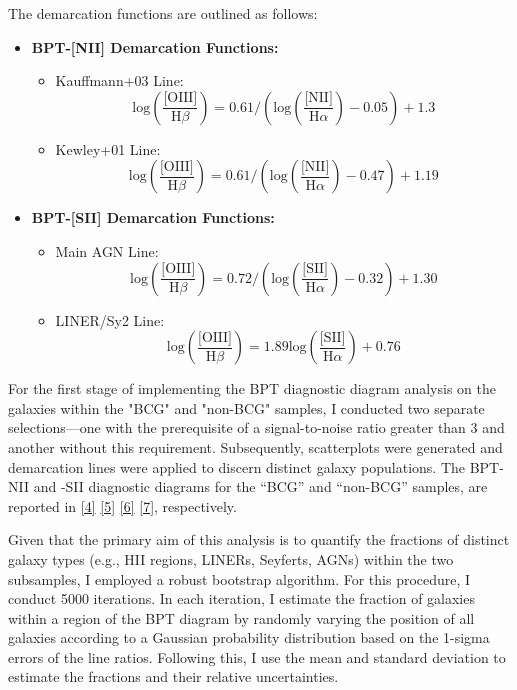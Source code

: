 The demarcation functions are outlined as follows:
\begin{itemize}
    \item \textbf{BPT-[NII] Demarcation Functions:}
    \begin{itemize}
        \item Kauffmann+03 Line: \[ \text{log}(\frac{\text{[OIII]}}{\text{H}\beta}) = 0.61 / (\text{log}(\frac{\text{[NII]}}{\text{H}\alpha}) - 0.05) + 1.3 \]
        \item Kewley+01 Line: \[ \text{log}(\frac{\text{[OIII]}}{\text{H}\beta}) = 0.61 / (\text{log}(\frac{\text{[NII]}}{\text{H}\alpha}) - 0.47) + 1.19 \]
    \end{itemize}

    \item \textbf{BPT-[SII] Demarcation Functions:}
    \begin{itemize}
        \item Main AGN Line: \[ \text{log}(\frac{\text{[OIII]}}{\text{H}\beta}) = 0.72 / (\text{log}(\frac{\text{[SII]}}{\text{H}\alpha}) - 0.32) + 1.30 \]
        \item LINER/Sy2 Line: \[ \text{log}(\frac{\text{[OIII]}}{\text{H}\beta}) = 1.89 \text{log}(\frac{\text{[SII]}}{\text{H}\alpha}) + 0.76 \]
    \end{itemize}
\end{itemize}


For the first stage of implementing the BPT diagnostic diagram analysis on the galaxies within the "BCG" and "non-BCG" samples, I conducted two separate selections—one with the prerequisite of a signal-to-noise ratio greater than 3 and another without this requirement. Subsequently, scatterplots were generated and demarcation lines were applied to discern distinct galaxy populations.
The BPT-NII and -SII diagnostic diagrams for the “BCG” and “non-BCG” samples, are reported in \autoref{4} \autoref{5} \autoref{6} \autoref{7}, respectively.

Given that the primary aim of this analysis is to quantify the fractions of distinct galaxy types (e.g., HII regions, LINERs, Seyferts, AGNs) within the two subsamples, I employed a robust bootstrap algorithm. For this procedure, I conduct 5000 iterations. In each iteration, I estimate the fraction of galaxies within a region of the BPT diagram by randomly varying the position of all galaxies according to a Gaussian probability distribution based on the 1-sigma errors of the line ratios. Following this, I use the mean and standard deviation to estimate the fractions and their relative uncertainties.


